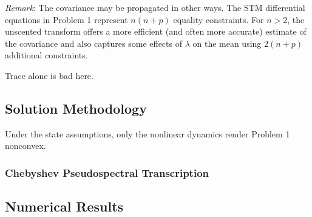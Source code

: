 \documentclass[10pt,a4paper]{article}
\begin{document}
	\textit{Remark}: The covariance may be propagated in other ways. The STM differential equations in Problem 1 represent $n(n+p)$ equality constraints. For $n>2$, the unscented transform offers a more efficient (and often more accurate) estimate of the covariance and also captures some effects of $\lambda$ on the mean using $2(n+p)$ additional constraints.
	
	Trace alone is bad here.
	
	\subsection{Solution Methodology}
	Under the state assumptions, only the nonlinear dynamics render Problem 1 nonconvex.
	
	
	

	
	\subsubsection{Chebyshev Pseudospectral Transcription}
	
	
	\subsection{Numerical Results}

	
\end{document}
